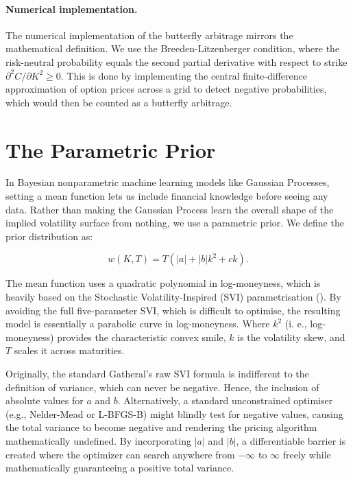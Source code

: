 \documentclass[12pt,oneside]{report}
\theoremstyle{definition}
\theoremstyle{remark}
\begin{document}
\paragraph{Numerical implementation.}
The numerical implementation of the butterfly arbitrage mirrors the mathematical definition. We use the Breeden-Litzenberger condition, where the risk-neutral probability equals the second partial derivative with respect to strike $\partial^2 C/\partial K^2\geq 0$. This is done by implementing the central finite-difference approximation of option prices across a grid to detect negative probabilities, which would then be counted as a butterfly arbitrage. 

\section{The Parametric Prior}
In Bayesian nonparametric machine learning models like Gaussian Processes, setting a mean function lets us include financial knowledge before seeing any data. Rather than making the Gaussian Process learn the overall shape of the implied volatility surface from nothing, we use a parametric prior.
We define the prior distribution as:

\begin{equation}
w(K,T) = T\left(|a| + |b|k^2 + c k\right).
\label{parametric_prior}
\end{equation}

The mean function uses a quadratic polynomial in log-moneyness, which is heavily based on the Stochastic Volatility-Inspired (SVI) parametrisation (\citet{gatheral2014arbitrage}). By avoiding the full five-parameter SVI, which is difficult to optimise, the resulting model is essentially a parabolic curve in log-moneyness. Where $k^2$ (i. e., log-moneyness) provides the characteristic convex smile, $k$ is the volatility skew, and $T$ scales it across maturities.

Originally, the standard Gatheral's raw SVI formula is indifferent to the definition of variance, which can never be negative. Hence, the inclusion of absolute values for $a$ and $b$. Alternatively, a standard unconstrained optimiser (e.g., Nelder-Mead or L-BFGS-B) might blindly test for negative values, causing the total variance to become negative and rendering the pricing algorithm mathematically undefined. By incorporating $|a|$ and $|b|$, a differentiable barrier is created where the optimizer can search anywhere from $-\infty$ to $\infty$ freely while mathematically guaranteeing a positive total variance.
\end{document}
